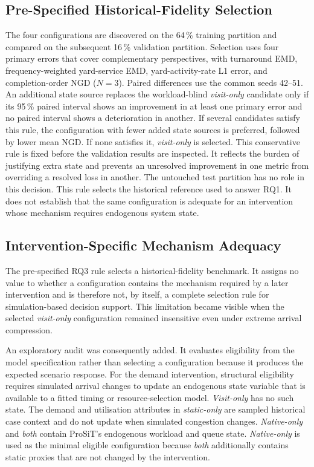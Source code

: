 \subsection{Pre-Specified Historical-Fidelity Selection}

The four configurations are discovered on the 64\,\% training partition and
compared on the subsequent 16\,\% validation partition. Selection uses four
primary errors that cover complementary perspectives, with turnaround EMD,
frequency-weighted yard-service EMD, yard-activity-rate L1 error, and
completion-order NGD ($N=3$). Paired differences use the common seeds 42--51.
An additional state source replaces the workload-blind \textit{visit-only}
candidate only if its 95\,\% paired interval shows an improvement in at least
one primary error and no paired interval shows a deterioration in another.
If several candidates satisfy this rule, the configuration with fewer added
state sources is preferred, followed by lower mean NGD. If none satisfies it,
\textit{visit-only} is selected. This conservative rule is fixed before the
validation results are inspected. It reflects the burden of justifying extra
state and prevents an unresolved improvement in one metric from overriding a
resolved loss in another. The untouched test partition has no role in this
decision. This rule selects the historical reference used to answer RQ1. It does not establish
that the same configuration is adequate for an intervention whose mechanism
requires endogenous system state.

\subsection{Intervention-Specific Mechanism Adequacy}
\label{sec:scenario_model_adequacy}

The pre-specified RQ3 rule selects a historical-fidelity benchmark. It assigns
no value to whether a configuration contains the mechanism required by a later
intervention and is therefore not, by itself, a complete selection rule for
simulation-based decision support. This limitation became visible when the
selected \textit{visit-only} configuration remained insensitive even under
extreme arrival compression.

An exploratory audit was consequently added. It evaluates eligibility from the
model specification rather than selecting a configuration because it produces
the expected scenario response. For the demand intervention, structural
eligibility requires simulated arrival changes to update an endogenous state
variable that is available to a fitted timing or resource-selection model.
\textit{Visit-only} has no such state. The demand and utilisation attributes in
\textit{static-only} are sampled historical case context and do not update when
simulated congestion changes. \textit{Native-only} and \textit{both} contain
ProSiT's endogenous workload and queue state. \textit{Native-only} is used as
the minimal eligible configuration because \textit{both} additionally contains
static proxies that are not changed by the intervention.


